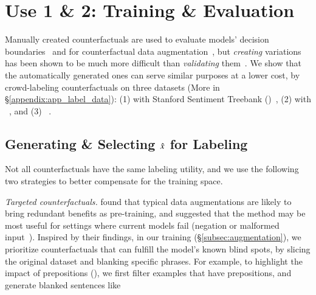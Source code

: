 \section{Use 1 \& 2: Training \& Evaluation}
\label{sec:app_label}

Manually created counterfactuals are used to evaluate models' decision boundaries~\cite{gardner2020contrast} and for counterfactual data augmentation~\cite{kaushik2019learning}, but \emph{creating} variations has been shown to be much more difficult than \emph{validating} them~\cite{ribeiro2018sear}.
We show that the automatically generated ones can serve similar purposes at a lower cost, by crowd-labeling counterfactuals on three datasets (More in \S\ref{appendix:app_label_data}): 
(1) \sst with Stanford Sentiment Treebank (\dsst)~\cite{socher2013recursive},
(2) \nli with \dnli~\cite{bowman-etal-2015-large}, and 
(3) \dqqp~\cite{wang2018glue}.

\subsection{Generating \& Selecting $\hat{x}$ for Labeling}
\label{subsec:gen_counterfactual_for_labeling}

Not all counterfactuals have the same labeling utility, and we use the following two strategies to better compensate for the training space.

\emph{Targeted counterfactuals.}
\citet{longpre2020effective} found that typical data augmentations are likely to bring redundant benefits as pre-training, and suggested that the method may be most useful for settings where current models fail (\eg negation or malformed input~\cite{rogers2020primer,ettinger2020bert}).
Inspired by their findings, in our training (\S\ref{subsec:augmentation}), we prioritize counterfactuals that can fulfill the model's known blind spots, by slicing the original dataset and blanking specific phrases.  
For example, to highlight the impact of prepositions (), we first filter examples that have prepositions, and generate blanked sentences like 

